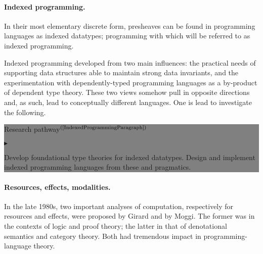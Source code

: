 \documentclass[11pt,twocolumn]{article}
\newenvironment{btritemize}
  {\begin{list}{\btr}
  {\setlength{\topsep}{2pt}
   \setlength{\partopsep}{2pt}
   \setlength{\itemsep}{2.5pt}
   \setlength{\parsep}{2.5pt}
   \setlength{\leftmargin}{1em}
   \setlength{\labelwidth}{.5em}}}
  {\end{list}}
\newcommand{\mytextsf}[1]{\textsf{\small #1}}
\newcommand{\btr}{$\blacktriangleright$}
\newcommand{\reqpsize}{8.113395cm}%
\newcommand{\rep}[2]{\begin{center}\colorbox{grey}{\begin{minipage}{\reqpsize}
  \mytextsf{Research pathway}\hfill$^{\mbox{\scriptsize #1 }}$\\[-5.5mm]
  \begin{btritemize}
  \item #2
  \end{btritemize}
\end{minipage}}\end{center}}
\begin{document}
\paragraph{Indexed programming.}
\label{IndexedProgrammingIntro}

In their most elementary discrete form, presheaves can be found in programming
languages as indexed datatypes; programming with which will be %
referred to as indexed programming.  

Indexed programming developed from two main influences:
the practical needs of supporting data structures able to
maintain strong data invariants, 
and the experimentation with dependently-typed programming
languages %
as a by-product of dependent type theory.  These two views somehow pull in
opposite directions and, as such, lead to conceptually different
languages.  One is lead to investigate the following.
\rep{(\ref{IndexedProgrammingParagraph})} 
  {Develop foundational type theories for indexed datatypes.  
   Design and %
   implement indexed programming languages from these and
   pragmatics.}

\paragraph{Resources, effects, modalities.}
\label{ResourcesEffectsModalitiesParagraph}

In the late 1980s, two important analyses of computation, respectively for
resources and effects, were proposed by Girard %
and by Moggi. %
The former was in the contexts of logic and proof theory; the latter in that
of denotational semantics and category theory.  Both %
had tremendous impact in programming-language theory.  
\end{document}

